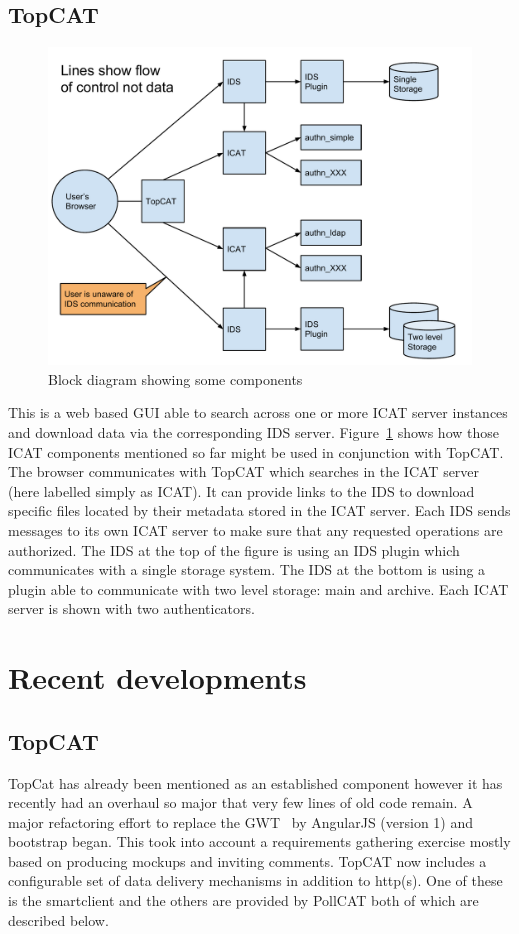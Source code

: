 \documentclass[a4paper]{jpconf}
\begin{document}
\subsection{TopCAT}
\begin{figure}[htp]
\begin{center}
  \includegraphics[scale=0.45]{ICATComponents.pdf}
    \caption{Block diagram showing some components}
    \label{fig:most_components}
\end{center}
\end{figure}
This is a web based GUI able to search across one or more ICAT server
instances and download data via the corresponding IDS server.
Figure~\ref{fig:most_components} shows how those ICAT components
mentioned so far might be used in conjunction with TopCAT.
The browser communicates with TopCAT which searches
in the ICAT server (here labelled simply as ICAT). It can provide
links to the IDS to download specific files located by their
metadata stored in the ICAT server. Each IDS sends messages to its
own ICAT server to make sure that any requested operations
are authorized. The IDS at the top of the figure is using an IDS
plugin which communicates with a single storage system. The IDS at
the bottom is using a plugin able to communicate with two level
storage: main and archive. Each ICAT server is shown with two
authenticators.

\section{Recent developments}
\subsection{TopCAT}
TopCat has already been mentioned as an established component however
it has recently had an overhaul so major that very few lines of old
code remain.  A major refactoring effort to replace the
GWT~\cite{ref:gwt} by AngularJS (version 1) and bootstrap began. This
took into account a requirements gathering exercise mostly based on
producing mockups and inviting comments. TopCAT now includes a
configurable set of data delivery mechanisms in addition to
http(s). One of these is the smartclient and the others are provided
by PollCAT both of which are described below.
\end{document}
